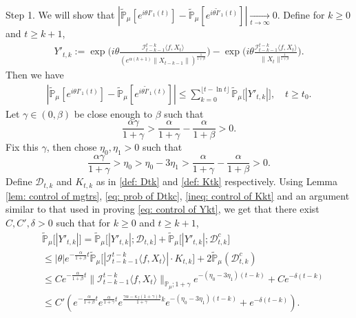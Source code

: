 \documentclass[12pt,a4paper]{amsart}
\theoremstyle{plain}
\theoremstyle{definition}
\numberwithin{equation}{section}
\begin{document}
    Step 1. 
    We will show that $|\mathbb{\tilde{P}}_{\mu}[e^{i\theta I'_1(t)}]-\mathbb{\tilde{P}}_{\mu}[e^{i\theta\tilde I'_1(t)}]|\xrightarrow[t\to \infty]{} 0$.
    Define for $k\geq 0$ and $t\geq k+1$,
\begin{align*}
    Y'_{t,k}
    :=\exp\Big(i\theta\frac{\mathcal I_{t-k-1}^{t-k}\langle f ,X_t\rangle}{( e^{\alpha(k+1)}\|X_{t-k-1}\|)^{\frac{1}{1+\beta}}}\Big)-\exp\Big(i\theta\frac{\mathcal I_{t-k-1}^{t-k}\langle f ,X_t\rangle}{\|X_t\|^{\frac{1}{1+\beta}}}\Big).
\end{align*}
	Then we have
\begin{equation}\begin{split}
\label{ineq: control of I1tb}
    |\mathbb{\tilde{P}}_{\mu}[e^{i\theta I'_1(t)}] - \mathbb{\tilde{P}}_{\mu} [e^{i\theta\tilde{I}'_1(t)}]|
    \leq \sum_{k=0}^{\lfloor t-\ln t \rfloor}\mathbb{\tilde{P}}_{\mu}\big[|Y'_{t,k}|\big],
    \quad t\geq t_0.
\end{split}\end{equation}
    Let $\gamma \in (0,\beta)$ be close enough to $\beta$ such that
\[
    \frac{\alpha \gamma}{1+\gamma} > \frac{\alpha}{1+\gamma} - \frac{\alpha}{1+\beta} > 0.
\]
    Fix this $\gamma$, then chose $\eta_0,\eta_1>0$ such that
\[
    \frac{\alpha \gamma}{1+\gamma} >\eta_0 > \eta_0 - 3\eta_1 > \frac{\alpha}{1+\gamma} - \frac{\alpha}{1+\beta} > 0.
\]
	Define $\mathcal D_{t,k}$ and $K_{t,k}$ as in \eqref{def: Dtk} and \eqref{def: Ktk} respectively.
	Using Lemma \ref{lem: control of mgtrs}, \eqref{eq: prob of Dtkc}, \eqref{ineq: control of Kkt} and an argument similar to that used in proving \eqref{eq: control of Ykt}, we get that there exist $C,C',\delta>0$ such that for $k\geq 0$ and $t\geq k+1$,
\begin{align*}
    &\mathbb{\tilde{P}}_{\mu}\big[|Y'_{t,k}|\big]
    = \mathbb{\tilde{P}}_{\mu}\big[|Y'_{t,k}|; \mathcal D_{t,k}\big] + \mathbb{\tilde{P}}_{\mu}\big[|Y'_{t,k}|; \mathcal D_{t,k}^c \big]
    \\& \leq |\theta| e^{-\frac{\alpha}{1+\beta} t}\mathbb{\tilde{P}}_{\mu}\big[|\mathcal I_{t-k-1}^{t-k}\langle f ,X_t\rangle|\cdot K_{t,k}\big] + 2\mathbb{\tilde{P}}_{\mu}( \mathcal D_{t,k}^c )
    \\& \leq C e^{-\frac{\alpha}{1+\beta} t} \|\mathcal I_{t-k-1}^{t-k}\langle f, X_t\rangle \|_{\mathbb P_\mu; 1+\gamma}e^{-(\eta_0 - 3\eta_1)(t-k)} + Ce^{-\delta(t-k)}
    \\& \leq C'( e^{-\frac{\alpha}{1+\beta}t}e^{\frac{\alpha}{1+\gamma}t}e^{\frac{\gamma \alpha-\kappa_f(1+\gamma)b}{1+\gamma}k}e^{-(\eta_0 - 3\eta_1)(t-k)}+ e^{-\delta(t-k)}).
\end{align*}
\end{document}
